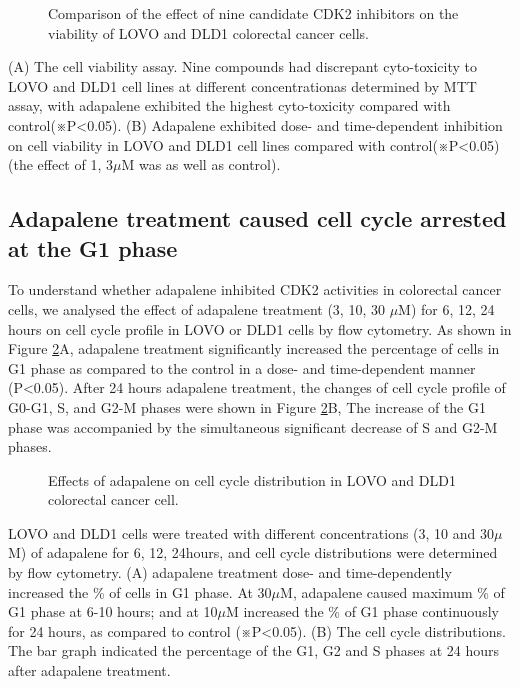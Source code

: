 \begin{figure}
\centering
\caption{Comparison of the effect of nine candidate CDK2 inhibitors on the viability of LOVO and DLD1 colorectal cancer cells.}
\label{cdk2:MTT}
\end{figure}
(A) The cell viability assay. Nine compounds had discrepant cyto-toxicity to LOVO and DLD1 cell lines at different concentrationas determined by MTT assay, with adapalene exhibited the highest cyto-toxicity compared with control(※P<0.05). (B) Adapalene exhibited dose- and time-dependent inhibition on cell viability in LOVO and DLD1 cell lines compared with control(※P<0.05)(the effect of 1, 3$\mu$M was as well as control).

\subsection{Adapalene treatment caused cell cycle arrested at the G1 phase}

To understand whether adapalene inhibited CDK2 activities in colorectal cancer cells, we analysed the effect of adapalene treatment (3, 10, 30 $\mu$M) for 6, 12, 24 hours on cell cycle profile in LOVO or DLD1 cells by flow cytometry. As shown in Figure \ref{cdk2:CellCycleDistribution}A, adapalene treatment significantly increased the percentage of cells in G1 phase as compared to the control in a dose- and time-dependent manner (P<0.05). After 24 hours adapalene treatment, the changes of cell cycle profile of G0-G1, S, and G2-M phases were shown in Figure \ref{cdk2:CellCycleDistribution}B, The increase of the G1 phase was accompanied by the simultaneous significant decrease of S and G2-M phases.

\begin{figure}
\centering
\caption{Effects of adapalene on cell cycle distribution in LOVO and DLD1 colorectal cancer cell.}
\label{cdk2:CellCycleDistribution}
\end{figure}
LOVO and DLD1 cells were treated with different concentrations (3, 10 and 30$\mu$M) of adapalene for 6, 12, 24hours, and cell cycle distributions were determined by flow cytometry. (A) adapalene treatment dose- and time-dependently increased the \% of cells in G1 phase. At 30$\mu$M, adapalene caused maximum \% of G1 phase at 6-10 hours; and at 10$\mu$M increased the \% of G1 phase continuously for 24 hours, as compared to control (※P<0.05). (B) The cell cycle distributions. The bar graph indicated the percentage of the G1, G2 and S phases at 24 hours after adapalene treatment.

